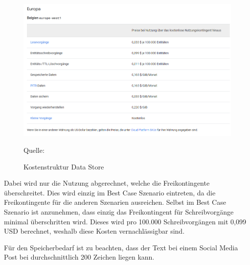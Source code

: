 \begin{figure}[htbp]
    \includegraphics[width=\textwidth, height=\textheight, keepaspectratio]{abbildungen/kostendatastore}
    \caption{Kostenstruktur Data Store}
    \label{fig:KostenDataStore}
    \raggedright Quelle:\cite{GoogleDatastorePricing2025}
\end{figure}


Dabei wird nur die Nutzung abgerechnet, welche die Freikontingente überschreitet.
Dies wird einzig im Best Case Szenario eintreten, da die Freikontingente für die anderen Szenarien ausreichen.
Selbst im Best Case Szenario ist anzunehmen, dass einzig das Freikontingent für Schreibvorgänge minimal überschritten wird.
Dieses wird pro 100.000 Schreibvorgängen mit 0,099 USD berechnet, weshalb diese Kosten vernachlässigbar sind.

Für den Speicherbedarf ist zu beachten, dass der Text bei einem Social Media Post bei durchschnittlich 200 Zeichen liegen kann.

